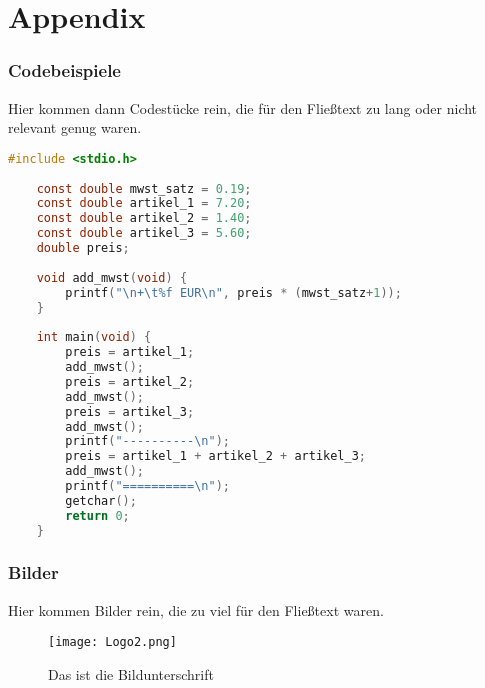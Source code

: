 \appendix
{}
\part*{\textsf{Appendix}}
\section{Codebeispiele}
Hier kommen dann Codestücke rein, die für den Fließtext zu lang oder nicht relevant genug waren.

\begin{lstlisting}[language=c,label=lst:code]
	#include <stdio.h>
	
	const double mwst_satz = 0.19;
	const double artikel_1 = 7.20;
	const double artikel_2 = 1.40;
	const double artikel_3 = 5.60;
	double preis;
	
	void add_mwst(void) {
		printf("\n+\t%f EUR\n", preis * (mwst_satz+1));
	}
	
	int main(void) {
		preis = artikel_1;
		add_mwst();
		preis = artikel_2;
		add_mwst();
		preis = artikel_3;
		add_mwst();
		printf("----------\n");
		preis = artikel_1 + artikel_2 + artikel_3;
		add_mwst();
		printf("==========\n");
		getchar();
		return 0;
	}
\end{lstlisting}

\section{Bilder}
Hier kommen Bilder rein, die zu viel für den Fließtext waren.

\begin{figure}[!h]
	\centering
	\texttt{[image: Logo2.png]}
	\caption{Das ist die Bildunterschrift}
	\label{fig:figref}
\end{figure}